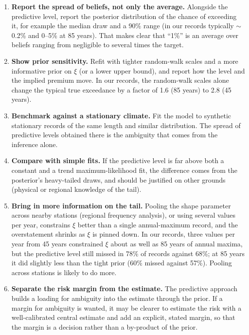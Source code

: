 \documentclass[11pt]{article}
\begin{document}
\begin{enumerate}
\item \textbf{Report the spread of beliefs, not only the average.} Alongside the predictive level,
  report the posterior distribution of the chance of exceeding it, for example the median draw and
  a 90\% range (in our records typically $\sim$0.2\% and 0--5\% at 85 years). That makes clear that
  ``1\%'' is an average over beliefs ranging from negligible to several times the target.
\item \textbf{Show prior sensitivity.} Refit with tighter random-walk scales and a more
  informative prior on $\xi$ (or a lower upper bound), and report how the level and the implied
  premium move. In our records, the random-walk scales alone change the typical true exceedance
  by a factor of 1.6 (85 years) to 2.8 (45 years).
\item \textbf{Benchmark against a stationary climate.} Fit the model to synthetic stationary
  records of the same length and similar distribution. The spread of predictive levels obtained
  there is the ambiguity that comes from the inference alone.
\item \textbf{Compare with simple fits.} If the predictive level is far above both a constant and a
  trend maximum-likelihood fit, the difference comes from the posterior's heavy-tailed draws, and
  should be justified on other grounds (physical or regional knowledge of the tail).
\item \textbf{Bring in more information on the tail.} Pooling the shape parameter across nearby
  stations (regional frequency analysis), or using several values per year, constrains $\xi$
  better than a single annual-maximum record, and the overstatement shrinks as $\xi$ is pinned down.
  In our records, three values per year from 45 years constrained $\xi$ about as well as 85 years
  of annual maxima, but the predictive level still missed in 78\% of records against 68\%; at
  85 years it did slightly less than the tight prior (60\% missed against 57\%). Pooling across
  stations is likely to do more.
\item \textbf{Separate the risk margin from the estimate.} The predictive approach builds a loading
  for ambiguity into the estimate through the prior. If a margin for ambiguity is wanted, it may be
  clearer to estimate the risk with a well-calibrated central estimate and add an explicit,
  stated margin, so that the margin is a decision rather than a by-product of the prior.
\end{enumerate}
\end{document}
